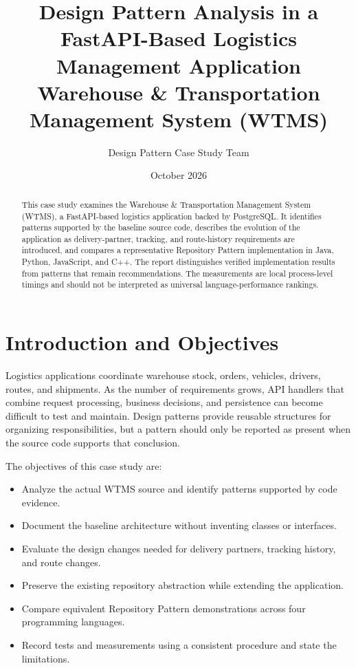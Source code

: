 \documentclass[12pt,a4paper]{article}
\title{\textbf{Design Pattern Analysis in a FastAPI-Based Logistics Management Application}\\
\large Warehouse \& Transportation Management System (WTMS)}
\author{Design Pattern Case Study Team}
\date{October 2026}
\begin{document}
\maketitle
\begin{abstract}
This case study examines the Warehouse \& Transportation Management System (WTMS), a FastAPI-based logistics application backed by PostgreSQL. It identifies patterns supported by the baseline source code, describes the evolution of the application as delivery-partner, tracking, and route-history requirements are introduced, and compares a representative Repository Pattern implementation in Java, Python, JavaScript, and C++. The report distinguishes verified implementation results from patterns that remain recommendations. The measurements are local process-level timings and should not be interpreted as universal language-performance rankings.
\end{abstract}

\tableofcontents
\newpage

\section{Introduction and Objectives}
Logistics applications coordinate warehouse stock, orders, vehicles, drivers, routes, and shipments. As the number of requirements grows, API handlers that combine request processing, business decisions, and persistence can become difficult to test and maintain. Design patterns provide reusable structures for organizing responsibilities, but a pattern should only be reported as present when the source code supports that conclusion.

The objectives of this case study are:
\begin{itemize}
    \item Analyze the actual WTMS source and identify patterns supported by code evidence.
    \item Document the baseline architecture without inventing classes or interfaces.
    \item Evaluate the design changes needed for delivery partners, tracking history, and route changes.
    \item Preserve the existing repository abstraction while extending the application.
    \item Compare equivalent Repository Pattern demonstrations across four programming languages.
    \item Record tests and measurements using a consistent procedure and state the limitations.
\end{itemize}
\end{document}
